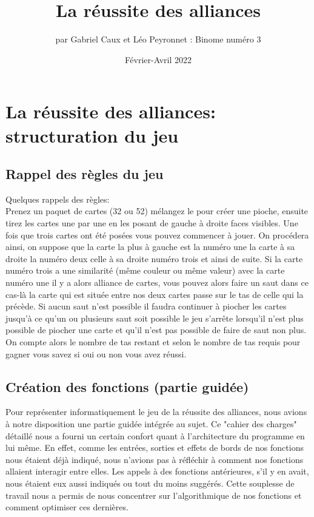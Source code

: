 \documentclass[10pt,a4paper,french,titlepage]{article}
\author{par Gabriel Caux et Léo Peyronnet : Binome numéro 3}
\title{La réussite des alliances}
\date{Février-Avril 2022}
\theoremstyle{definition}
\begin{document}
\maketitle
\tableofcontents
\section{La réussite des alliances: structuration du jeu}
\subsection{Rappel des règles du jeu}
Quelques rappels des règles: \\
Prenez un paquet de cartes (32 ou 52) mélangez le pour créer une pioche, ensuite tirez les cartes une par une en les posant de gauche à droite faces visibles. Une fois que trois cartes ont été posées vous pouvez commencer à jouer. On procédera ainsi, on suppose que la carte la plus à gauche est la numéro une la carte à sa droite la numéro deux celle à sa droite numéro trois et ainsi de suite. Si la carte numéro trois a une similarité (même couleur ou même valeur) avec la carte numéro une il y a alors alliance de cartes, vous pouvez alors faire un saut dans ce cas-là la carte qui est située entre nos deux cartes passe sur le tas de celle qui la précède. Si aucun saut n'est possible il faudra continuer à piocher les cartes jusqu'à ce qu'un ou plusieurs saut soit possible le jeu s'arrête lorsqu'il n'est plus possible de piocher une carte et qu'il n'est pas possible de faire de saut non plus. On compte alors le nombre de tas restant et selon le nombre de tas requis pour gagner vous savez si oui ou non vous avez réussi.

\subsection{Création des fonctions (partie guidée)}
Pour représenter informatiquement le jeu de la réussite des alliances, nous avions à notre disposition une partie guidée intégrée au sujet. Ce "cahier des charges" détaillé nous a fourni un certain confort quant à l'architecture du programme en lui même. En effet, comme les entrées, sorties et effets de bords de nos fonctions nous étaient déjà indiqué, nous n'avions pas à réfléchir à comment nos fonctions allaient interagir entre elles. Les appels à des fonctions antérieures, s'il y en avait, nous étaient eux aussi indiqués ou tout du moins suggérés. Cette souplesse de travail nous a permis de nous concentrer sur l'algorithmique de nos fonctions et comment optimiser ces dernières.
\end{document}
